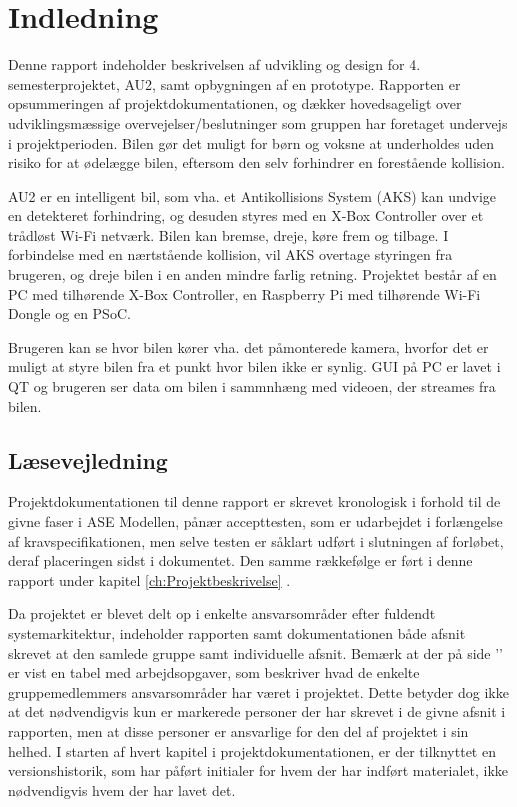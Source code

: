 \chapter{Indledning}
\label{ch:Indledning}

Denne rapport indeholder beskrivelsen af udvikling og design for 4. semesterprojektet, AU2, samt opbygningen af en prototype. 
Rapporten er opsummeringen af projektdokumentationen, og dækker hovedsageligt over udviklingsmæssige overvejelser/beslutninger som gruppen har foretaget undervejs i projektperioden. 
Bilen gør det muligt for børn og voksne at underholdes uden risiko for at ødelægge bilen, eftersom den selv forhindrer en forestående kollision.

AU2 er en intelligent bil, som vha. et Antikollisions System (AKS) kan undvige en detekteret forhindring, og desuden styres med en X-Box Controller over et trådløst Wi-Fi netværk. Bilen kan bremse, dreje, køre frem og tilbage.
I forbindelse med en nærtstående kollision, vil AKS overtage styringen fra brugeren, og dreje bilen i en anden mindre farlig retning. 
Projektet består af en PC med tilhørende X-Box Controller, en Raspberry Pi med tilhørende Wi-Fi Dongle og en PSoC. 

Brugeren kan se hvor bilen kører vha. det påmonterede kamera, hvorfor det er muligt at styre bilen fra et punkt hvor bilen ikke er synlig.
GUI på PC er lavet i QT og brugeren ser data om bilen i sammnhæng med videoen, der streames fra bilen.

\section{Læsevejledning}
Projektdokumentationen til denne rapport er skrevet kronologisk i forhold til de givne faser i ASE Modellen\cite{lib:vejledning}, pånær accepttesten, som er udarbejdet i forlængelse af kravspecifikationen, men selve testen er såklart udført i slutningen af forløbet, deraf placeringen sidst i dokumentet.
Den samme rækkefølge er ført i denne rapport under kapitel \ref{ch:Projektbeskrivelse} .

Da projektet er blevet delt op i enkelte ansvarsområder efter fuldendt systemarkitektur, indeholder rapporten samt dokumentationen både afsnit skrevet at den samlede gruppe samt individuelle afsnit.
Bemærk at der på side '\pageref{ch:arbejdsopgaver}' er vist en tabel med arbejdsopgaver, som beskriver hvad de enkelte gruppemedlemmers ansvarsområder har været i projektet. 
Dette betyder dog ikke at det nødvendigvis kun er markerede personer der har skrevet i de givne afsnit i rapporten, men at disse personer er ansvarlige for den del af projektet i sin helhed.
I starten af hvert kapitel i projektdokumentationen, er der tilknyttet en versionshistorik, som har påført initialer for hvem der har indført materialet, ikke nødvendigvis hvem der har lavet det.

